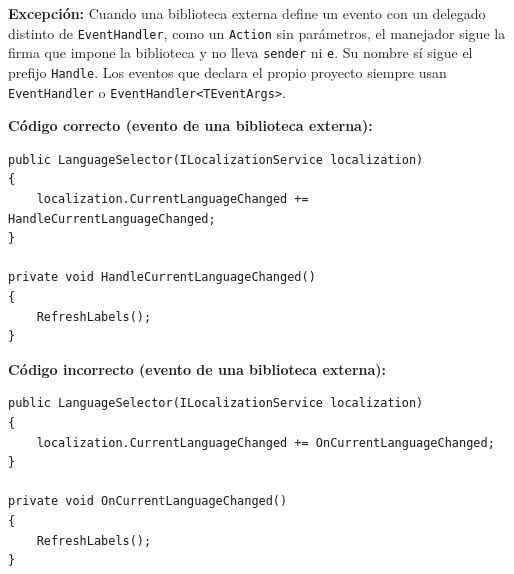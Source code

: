 \textbf{Excepción:} Cuando una biblioteca externa define un evento con un delegado distinto de \texttt{EventHandler}, como un \texttt{Action} sin parámetros, el manejador sigue la firma que impone la biblioteca y no lleva \texttt{sender} ni \texttt{e}. Su nombre sí sigue el prefijo \texttt{Handle}. Los eventos que declara el propio proyecto siempre usan \texttt{EventHandler} o \texttt{EventHandler<TEventArgs>}.

\textbf{Código correcto (evento de una biblioteca externa):}
\begin{lstlisting}[style=csharpstyle]
public LanguageSelector(ILocalizationService localization)
{
    localization.CurrentLanguageChanged += HandleCurrentLanguageChanged;
}

private void HandleCurrentLanguageChanged()
{
    RefreshLabels();
}
\end{lstlisting}

\textbf{Código incorrecto (evento de una biblioteca externa):}
\begin{lstlisting}[style=csharpstyle]
public LanguageSelector(ILocalizationService localization)
{
    localization.CurrentLanguageChanged += OnCurrentLanguageChanged;
}

private void OnCurrentLanguageChanged()
{
    RefreshLabels();
}
\end{lstlisting}
